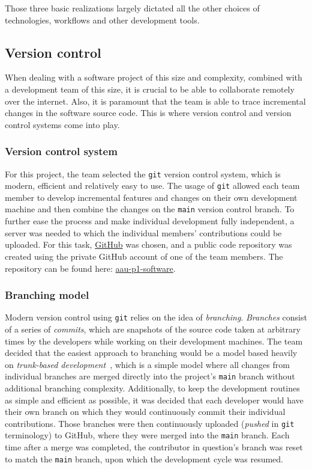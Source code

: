 Those three basic realizations largely dictated all the other choices of technologies, workflows and other development
tools.

\subsection{Version control}\label{subsec:version-control}

When dealing with a software project of this size and complexity, combined with a development team of this size, it is
crucial to be able to collaborate remotely over the internet.
Also, it is paramount that the team is able to trace incremental changes in the software source code.
This is where version control and version control systems come into play.

\subsubsection{Version control system}

For this project, the team selected the \lstinline{git} version control system, which is modern, efficient and
relatively easy to use.
The usage of \lstinline{git} allowed each team member to develop incremental features and changes on their own
development machine and then combine the changes on the \lstinline{main} version control branch.
To further ease the process and make individual development fully independent, a server was needed to which the
individual members' contributions could be uploaded.
For this task, \href{https://github.com/}{GitHub} was chosen, and a public code repository was created using the private
GitHub account of one of the team members.
The repository can be found here: \href{https://github.com/audio-engineer/aau-p1-software}{aau-p1-software}.

\subsubsection{Branching model}

Modern version control using \lstinline{git} relies on the idea of \textit{branching}.
\textit{Branches} consist of a series of \textit{commits}, which are snapshots of the source code taken at arbitrary
times by the developers while working on their development machines.
The team decided that the easiest approach to branching would be a model based heavily on \textit{trunk-based
development}~\cite{trunk-based}, which is a simple model where all changes from individual branches are merged directly
into the project's \lstinline{main} branch without additional branching complexity.
Additionally, to keep the development routines as simple and efficient as possible, it was decided that each developer
would have their own branch on which they would continuously commit their individual contributions.
Those branches were then continuously uploaded (\textit{pushed} in \lstinline{git} terminology) to GitHub, where they
were merged into the \lstinline{main} branch.
Each time after a merge was completed, the contributor in question's branch was reset to match the \lstinline{main}
branch, upon which the development cycle was resumed.

